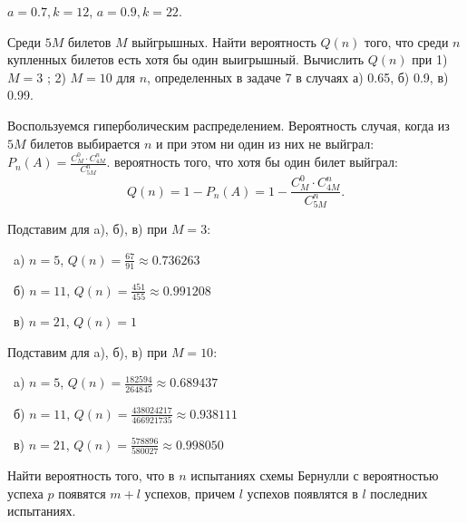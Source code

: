 \begin{result}
  $a = 0.7, k = 12$, $a = 0.9, k = 22$.
\end{result}

\medskip
\begin{task}{8}
Среди $5M$ билетов $M$ выйгрышных. Найти вероятность $Q(n)$ того, что среди $n$ купленных билетов 
есть хотя бы один выигрышный. Вычислить $Q(n)$ при 1) $M = 3$ ; 2) $M = 10$ для $n$, определенных
в задаче 7 в случаях а) 0.65, б) 0.9, в) 0.99.
\end{task}

\begin{solution}
Воспользуемся гиперболическим распределением. Вероятность случая, когда из $5M$ билетов выбирается
$n$ и при этом ни один из них не выйграл: $P_n(A) = \frac{C_M^0 \cdot C_{4M}^n}{C_{5M}^n}$.
\medskip
{} вероятность того, что хотя бы один билет выйграл: 
\[
  Q(n) = 1 - P_n(A) = 1 - \frac{C_M^0 \cdot C_{4M}^n}{C_{5M}^n}
.\] 
\end{solution}

\begin{subtask}{1}
Подставим для a), б), в) при $M = 3$:

\medskip
\noindent\textbullet~a) $n = 5$, $Q(n) = \frac{67}{91} \approx 0.736263$

\medskip
\noindent\textbullet~б) $n = 11$, $Q(n) = \frac{451}{455} \approx 0.991208$

\medskip
\noindent\textbullet~в) $n = 21$, $Q(n) = 1$
\end{subtask}

\begin{subtask}{2}
Подставим для a), б), в) при $M = 10$:

\medskip
\noindent\textbullet~a) $n = 5$, $Q(n) = \frac{182594}{264845} \approx 0.689437$

\medskip
\noindent\textbullet~б) $n = 11$, $Q(n) = \frac{438024217}{466921735} \approx 0.938111$

\medskip
\noindent\textbullet~в) $n = 21$, $Q(n) = \frac{578896}{580027} \approx 0.998050$

\end{subtask}

\medskip
\begin{task}{9}
Найти вероятность того, что в $n$ испытаниях схемы Бернулли с вероятностью успеха $p$ появятся $m + l$ 
успехов, причем $l$ успехов появлятся в $l$ последних испытаниях.
\end{task}

